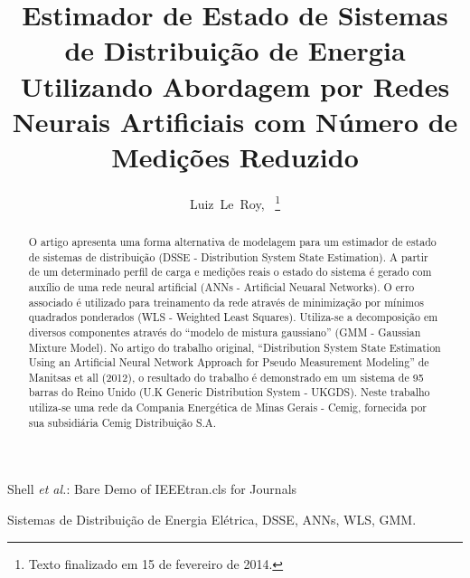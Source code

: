 \documentclass{IEEEtran}
\begin{document}
%
\title{Estimador de Estado de Sistemas de Distribuição de Energia Utilizando Abordagem por Redes Neurais Artificiais com Número de Medições Reduzido}
%
%
%

\author{Luiz~Le~Roy,~
\thanks{Texto finalizado em 15 de fevereiro de 2014.}}

%
{Shell \MakeLowercase{\textit{et al.}}: Bare Demo of IEEEtran.cls for Journals}

\maketitle

\begin{abstract}
O artigo apresenta uma forma alternativa de modelagem para um estimador de estado de sistemas de distribuição (DSSE - Distribution System State Estimation). A partir de um determinado perfil de carga e medições reais o estado do sistema é gerado com auxílio de uma rede neural artificial (ANNs - Artificial Neuaral Networks).
O erro associado é utilizado para treinamento da rede através de minimização por mínimos quadrados ponderados (WLS - Weighted Least Squares). Utiliza-se a decomposição em diversos componentes através do ``modelo de mistura gaussiano'' (GMM - Gaussian Mixture Model). No artigo do trabalho original, ``Distribution System State Estimation Using an Artificial Neural Network Approach for Pseudo Measurement Modeling'' de Manitsas et all (2012), o resultado do trabalho é demonstrado em um sistema de 95 barras do Reino Unido (U.K Generic Distribution System - UKGDS). Neste trabalho utiliza-se uma rede da Compania Energética de Minas Gerais - Cemig, fornecida por sua subsidiária Cemig Distribuição S.A.
\end{abstract}

\begin{IEEEkeywords}
Sistemas de Distribuição de Energia Elétrica, DSSE, ANNs, WLS, GMM.
\end{IEEEkeywords}
\end{document}
